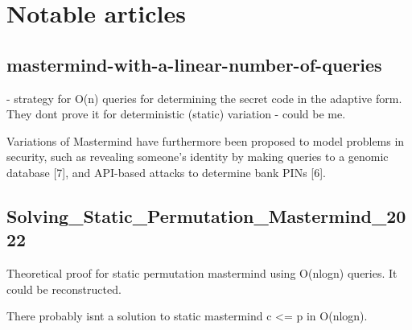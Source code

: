 \chapter{Notable articles}

\section{mastermind-with-a-linear-number-of-queries}
 - strategy for O(n) queries for determining the secret code in the adaptive form. They dont prove it for deterministic (static) variation - could be me.

Variations of Mastermind have furthermore been proposed to model problems in security,
such as revealing someone’s identity by making queries to a genomic database [7], and API-based
attacks to determine bank PINs [6].

\section{Solving_Static_Permutation_Mastermind_2022}
Theoretical proof for static permutation mastermind using O(nlogn) queries. It could be reconstructed.

There probably isnt a solution to static mastermind c <= p in O(nlogn).

